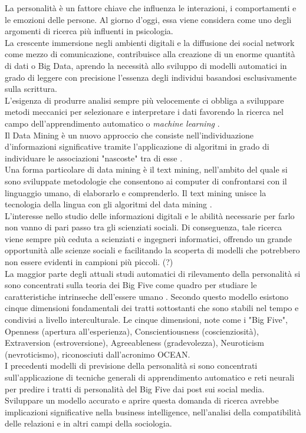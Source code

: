 La personalità è un fattore chiave che influenza le interazioni, i comportamenti e le emozioni delle persone. Al giorno d'oggi, essa viene considera come uno degli argomenti di ricerca più influenti in psicologia.
\\
La crescente immersione negli ambienti digitali e la diffusione dei social network come mezzo di comunicazione, contribuisce alla creazione di un enorme quantità di dati o Big Data, aprendo la necessità allo sviluppo di modelli automatici in grado di leggere con precisione l'essenza degli individui basandosi esclusivamente sulla scrittura.
\\
L'esigenza di produrre analisi sempre più velocemente ci obbliga a sviluppare metodi meccanici per selezionare e interpretare i dati favorendo la ricerca nel campo dell'apprendimento automatico o \emph{machine learning} \cite{samuel1959some}.
\\
Il Data Mining è un nuovo approccio che consiste nell'individuazione d’informazioni significative tramite l'applicazione di algoritmi in grado di individuare le associazioni "nascoste" tra di esse  \cite{?}. 
\\
Una forma particolare di data mining è il text mining, nell'ambito del quale si sono sviluppate metodologie che consentono ai computer di confrontarsi con il linguaggio umano, di elaborarlo e comprenderlo. Il text mining unisce la tecnologia della lingua con gli algoritmi del data mining  \cite{?}.
\\
L'interesse nello studio delle informazioni digitali e le abilità necessarie per farlo non vanno di pari passo tra gli scienziati sociali. Di conseguenza, tale ricerca viene sempre più ceduta a scienziati e ingegneri informatici, offrendo un grande opportunità alle scienze sociali e facilitando la scoperta di modelli che potrebbero non essere evidenti in campioni più piccoli. (?)
\\
La maggior parte degli attuali studi automatici di rilevamento della personalità si sono concentrati sulla teoria dei Big Five come quadro per studiare le caratteristiche intrinseche dell'essere umano \cite{barrick1991big}.
Secondo questo modello esistono cinque dimensioni fondamentali dei tratti sottostanti che sono stabili nel tempo e condivisi a livello interculturale. Le cinque dimensioni, note come i "Big Five", Openness (apertura all'esperienza), Conscientiousness (coscienziosità), Extraversion (estroversione), Agreeableness (gradevolezza), Neuroticism (nevroticismo), riconosciuti dall'acronimo OCEAN.
\\
I precedenti modelli di previsione della personalità si sono concentrati sull'applicazione di tecniche generali di apprendimento automatico e reti neurali per predire i tratti di personalità del Big Five dai post sui social media. 
\\
Sviluppare un modello accurato e aprire questa domanda di ricerca avrebbe implicazioni significative nella business intelligence, nell'analisi della compatibilità delle relazioni e in altri campi della sociologia.

